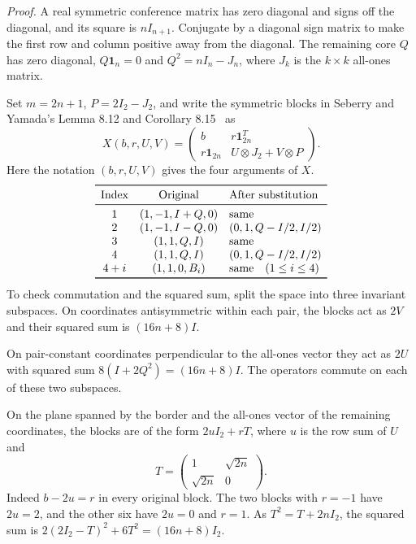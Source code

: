 \documentclass[10pt]{article}
\begin{document}
\smallskip
\noindent\textit{Proof.}
A real symmetric conference matrix has zero diagonal and signs off the diagonal, and its square is $nI_{n+1}$. Conjugate by a diagonal sign matrix to make the first row and column positive away from the diagonal. The remaining core $Q$ has zero diagonal, $Q\mathbf 1_n=0$ and $Q^2=nI_n-J_n$, where $J_k$ is the $k\times k$ all-ones matrix.

Set $m=2n+1$, $P=2I_2-J_2$, and write the symmetric blocks in Seberry and Yamada's Lemma 8.12 and Corollary 8.15~\cite{sy} as
\[
 X(b,r,U,V)=
 \begin{pmatrix}
 b & r\mathbf 1_{2n}^T\\
 r\mathbf 1_{2n} & U\otimes J_2+V\otimes P
 \end{pmatrix}.
\]
Here the notation $(b,r,U,V)$ gives the four arguments of $X$.
\[
\begin{array}{ccl}
\toprule
\text{Index} & \text{Original} & \text{After substitution}\\
\midrule
1 &(1,-1,I+Q,0)&\text{same}\\
2 &(1,-1,I-Q,0)&(0,1,Q-I/2,I/2)\\
3 &(1,1,Q,I)&\text{same}\\
4 &(1,1,Q,I)&(0,1,Q-I/2,I/2)\\
4+i &(1,1,0,B_i)&\text{same}\quad (1\le i\le 4)\\
\bottomrule
\end{array}
\]
To check commutation and the squared sum, split the space into three invariant subspaces. On coordinates antisymmetric within each pair, the blocks act as $2V$ and their squared sum is $(16n+8)I$.

On pair-constant coordinates perpendicular to the all-ones vector they act as $2U$ with squared sum $8(I+2Q^2)=(16n+8)I$. The operators commute on each of these two subspaces.

On the plane spanned by the border and the all-ones vector of the remaining coordinates, the blocks are of the form $2uI_2+rT$, where $u$ is the row sum of $U$ and
\[
 T=\begin{pmatrix}1&\sqrt{2n}\\\sqrt{2n}&0\end{pmatrix}.
\]
Indeed $b-2u=r$ in every original block. The two blocks with $r=-1$ have $2u=2$, and the other six have $2u=0$ and $r=1$. As $T^2=T+2nI_2$, the squared sum is $2(2I_2-T)^2+6T^2=(16n+8)I_2$.
\end{document}

